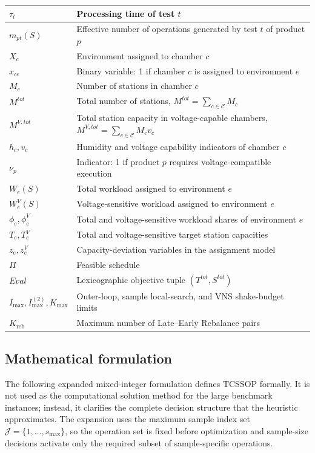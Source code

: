 \documentclass[11pt]{article}
\begin{document}
\begin{table}[H]
\begin{tabular}{|l|l|}
\(\tau_t\) & Processing time of test \(t\) \\ \hline
\(m_{pt}(S)\) & Effective number of operations generated by test \(t\) of product \(p\) \\ \hline
\(X_c\) & Environment assigned to chamber \(c\) \\ \hline
\(x_{ce}\) & Binary variable: 1 if chamber \(c\) is assigned to environment \(e\) \\ \hline
\(M_c\) & Number of stations in chamber \(c\) \\ \hline
\(M^{tot}\) & Total number of stations, \(M^{tot}=\sum_{c\in\mathcal{C}}M_c\) \\ \hline
\(M^{V,tot}\) & Total station capacity in voltage-capable chambers, \(M^{V,tot}=\sum_{c\in\mathcal{C}}M_cv_c\) \\ \hline
\(h_c,v_c\) & Humidity and voltage capability indicators of chamber \(c\) \\ \hline
\(\nu_p\) & Indicator: 1 if product \(p\) requires voltage-compatible execution \\ \hline
\(W_e(S)\) & Total workload assigned to environment \(e\) \\ \hline
\(W_e^V(S)\) & Voltage-sensitive workload assigned to environment \(e\) \\ \hline
\(\phi_e,\phi_e^V\) & Total and voltage-sensitive workload shares of environment \(e\) \\ \hline
\(T_e,T_e^V\) & Total and voltage-sensitive target station capacities \\ \hline
\(z_e,z_e^V\) & Capacity-deviation variables in the assignment model \\ \hline
\(\Pi\) & Feasible schedule \\ \hline
\(Eval\) & Lexicographic objective tuple \((T^{tot},S^{tot})\) \\ \hline
\(I_{\max},I_{\max}^{(2)},K_{\max}\) & Outer-loop, sample local-search, and VNS shake-budget limits \\ \hline
\(K_{\mathrm{reb}}\) & Maximum number of Late--Early Rebalance pairs \\ \hline
\end{tabular}
\end{table}

\subsection{Mathematical formulation}
\label{subsec:math_formulation}

The following expanded mixed-integer formulation defines TCSSOP formally. It is not used as the computational solution method for the large benchmark instances; instead, it clarifies the complete decision structure that the heuristic approximates. The expansion uses the maximum sample index set \(\mathcal{J}=\{1,\ldots,s_{\max}\}\), so the operation set is fixed before optimization and sample-size decisions activate only the required subset of sample-specific operations.
\end{document}

